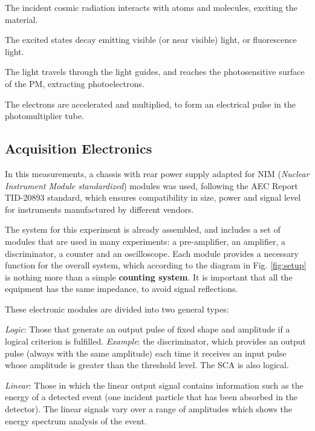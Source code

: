 	\ben
		\item The incident cosmic radiation interacts with atoms and molecules, exciting the material.
		\item The excited states decay emitting visible (or near visible) light, or fluorescence light.
		\item The light travels through the light guides, and reaches the photosensitive surface of the PM, extracting photoelectrons.
		\item The electrons are accelerated and multiplied, to form an electrical pulse in the photomultiplier tube.
	\een


	\subsection{Acquisition Electronics}

In this measurements, a chassis with rear power supply adapted for NIM (\textit{Nuclear Instrument Module standardized}) modules was used, following the AEC Report TID-20893 standard, which ensures compatibility in size, power and signal level for instruments manufactured by different vendors.

The system for this experiment is already assembled, and includes a set of modules that are used in many experiments: a pre-amplifier, an amplifier, a discriminator, a counter and an oscilloscope. Each module provides a necessary function for the overall system, which according to the diagram in Fig. \ref{fig:setup} is nothing more than a simple \textbf{counting system}. It is important that all the equipment has the same impedance, to avoid signal reflections.

These electronic modules are divided into two general types:

	\bi
		\item \textit{Logic}: Those that generate an output pulse of fixed shape and amplitude if a logical criterion is fulfilled. \textit{Example}: the discriminator, which provides an output pulse (always with the same amplitude) each time it receives an input pulse whose amplitude is greater than the threshold level. The SCA is also logical.

		\item \textit{Linear}: Those in which the linear output signal contains information such as the energy of a detected event (one incident particle that has been absorbed in the detector). The linear signals vary over a range of amplitudes which shows the energy spectrum analysis of the event.
	\ei

